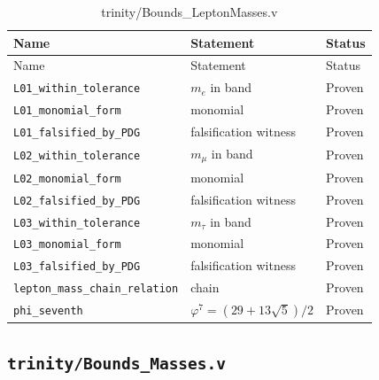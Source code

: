 \begin{longtable}{lll}
\toprule
Name & Statement & Status \\
\midrule
\endfirsthead
\toprule
Name & Statement & Status \\
\midrule
\endhead
\bottomrule
\endfoot
\bottomrule
\caption{trinity/Bounds\_LeptonMasses.v}
\endlastfoot
\texttt{L01\_within\_tolerance} & $m_{e}$ in band & Proven \\
\texttt{L01\_monomial\_form} & monomial & Proven \\
\texttt{L01\_falsified\_by\_PDG} & falsification witness & Proven \\
\texttt{L02\_within\_tolerance} & $m_{\mu}$ in band & Proven \\
\texttt{L02\_monomial\_form} & monomial & Proven \\
\texttt{L02\_falsified\_by\_PDG} & falsification witness & Proven \\
\texttt{L03\_within\_tolerance} & $m_{\tau}$ in band & Proven \\
\texttt{L03\_monomial\_form} & monomial & Proven \\
\texttt{L03\_falsified\_by\_PDG} & falsification witness & Proven \\
\texttt{lepton\_mass\_chain\_relation} & chain & Proven \\
\texttt{phi\_seventh} & $\varphi^{7}=(29+13\sqrt{5})/2$ & Proven \\
\end{longtable}

\subsection{\texttt{trinity/Bounds\_Masses.v}}
\label{sec:A-coq-masses}

